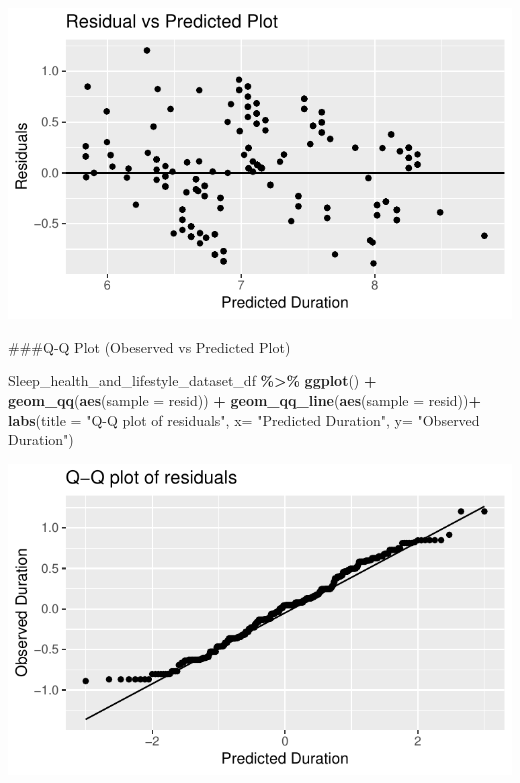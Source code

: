 \documentclass[
  11pt,
]{article}
\newenvironment{Shaded}{\begin{snugshade}}{\end{snugshade}}
\newcommand{\AttributeTok}[1]{\textcolor[rgb]{0.13,0.29,0.53}{#1}}
\newcommand{\FunctionTok}[1]{\textcolor[rgb]{0.13,0.29,0.53}{\textbf{#1}}}
\newcommand{\NormalTok}[1]{#1}
\newcommand{\SpecialCharTok}[1]{\textcolor[rgb]{0.81,0.36,0.00}{\textbf{#1}}}
\newcommand{\StringTok}[1]{\textcolor[rgb]{0.31,0.60,0.02}{#1}}
\begin{document}
\begin{center}\includegraphics[width=0.7\linewidth]{SleepHelath_files/figure-latex/unnamed-chunk-59-1} \end{center}

\#\#\#Q-Q Plot (Obeserved vs Predicted Plot)

\begin{Shaded}
\begin{Highlighting}[]
\NormalTok{Sleep\_health\_and\_lifestyle\_dataset\_df }\SpecialCharTok{\%\textgreater{}\%}
  \FunctionTok{ggplot}\NormalTok{() }\SpecialCharTok{+}
  \FunctionTok{geom\_qq}\NormalTok{(}\FunctionTok{aes}\NormalTok{(}\AttributeTok{sample =}\NormalTok{ resid)) }\SpecialCharTok{+}
  \FunctionTok{geom\_qq\_line}\NormalTok{(}\FunctionTok{aes}\NormalTok{(}\AttributeTok{sample =}\NormalTok{ resid))}\SpecialCharTok{+}
  \FunctionTok{labs}\NormalTok{(}\AttributeTok{title =} \StringTok{"Q{-}Q plot of residuals"}\NormalTok{, }\AttributeTok{x=} \StringTok{"Predicted Duration"}\NormalTok{, }\AttributeTok{y=} \StringTok{"Observed Duration"}\NormalTok{)}
\end{Highlighting}
\end{Shaded}

\begin{center}\includegraphics[width=0.7\linewidth]{SleepHelath_files/figure-latex/unnamed-chunk-60-1} \end{center}
\end{document}
